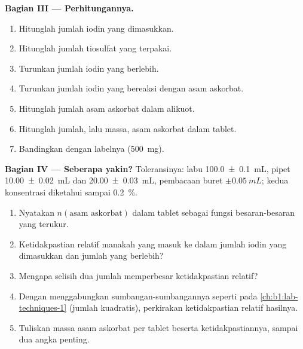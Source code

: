 \begin{problem}
\medskip
\noindent\textbf{Bagian III --- Perhitungannya.}
\begin{enumerate}[resume]
  \item Hitunglah jumlah iodin yang dimasukkan.
  \item Hitunglah jumlah tiosulfat yang terpakai.
  \item Turunkan jumlah iodin yang berlebih.
  \item Turunkan jumlah iodin yang bereaksi dengan asam askorbat.
  \item Hitunglah jumlah asam askorbat dalam alikuot.
  \item Hitunglah jumlah, lalu massa, asam askorbat dalam tablet.
  \item Bandingkan dengan labelnya (\qty{500}{mg}).
\end{enumerate}

\medskip
\noindent\textbf{Bagian IV --- Seberapa yakin?}
Toleransinya: labu \qty{100.0 \pm 0.1}{mL}, pipet
\qty{10.00 \pm 0.02}{mL} dan \qty{20.00 \pm 0.03}{mL}, pembacaan buret
$\pm\qty{0.05}{mL}$; kedua konsentrasi diketahui sampai \qty{0.2}{\percent}.
\begin{enumerate}[resume]
  \item Nyatakan $n(\text{asam askorbat})$ dalam tablet sebagai fungsi
        besaran-besaran yang terukur.
  \item Ketidakpastian relatif manakah yang masuk ke dalam jumlah iodin
        yang dimasukkan dan jumlah yang berlebih?
  \item Mengapa selisih dua jumlah memperbesar ketidakpastian relatif?
  \item Dengan menggabungkan sumbangan-sumbangannya seperti pada
        \cref{ch:b1:lab-techniques-1} (jumlah kuadratis), perkirakan
        ketidakpastian relatif hasilnya.
  \item Tuliskan massa asam askorbat per tablet beserta
        ketidakpastiannya, sampai dua angka penting.
\end{enumerate}
\end{problem}
